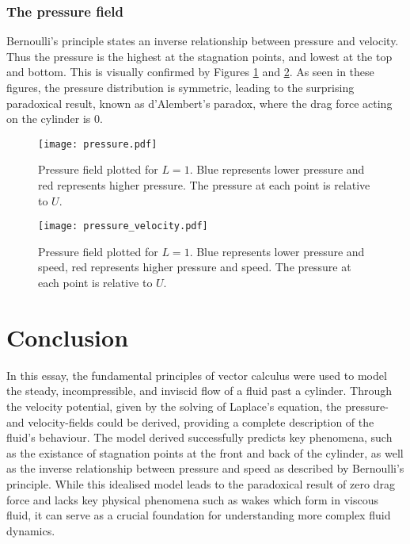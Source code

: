 \subsubsection{The pressure field}
Bernoulli's principle states an inverse relationship between pressure and velocity. Thus the pressure is the highest at the stagnation points,
and lowest at the top and bottom. This is visually confirmed by Figures \ref{figure:pressure:1} and \ref{figure:pressure:2}. As seen in these figures,
the pressure distribution is symmetric, leading to the surprising paradoxical result, known as d'Alembert's paradox, where the drag force acting on the cylinder is $0$.
\begin{figure}
	\centering
	\texttt{[image: pressure.pdf]}
	\caption{Pressure field plotted for $L=1$. Blue represents lower pressure and red represents higher pressure. The pressure at each point is relative to $U$.}
	\label{figure:pressure:1}
\end{figure}
\begin{figure}
	\centering
	\texttt{[image: pressure\_velocity.pdf]}
	\caption{Pressure field plotted for $L=1$. Blue represents lower pressure and speed, red represents higher pressure and speed. The pressure at each point is relative to $U$.}
	\label{figure:pressure:2}
\end{figure}

\section{Conclusion}
In this essay, the fundamental principles of vector calculus were used to model the steady, incompressible, and inviscid flow of a fluid past a cylinder.
Through the velocity potential, given by the solving of Laplace's equation, the pressure- and velocity-fields could be derived, providing a complete 
description of the fluid's behaviour. The model derived successfully predicts key phenomena, such as the existance of stagnation points at the front and
back of the cylinder, as well as the inverse relationship between pressure and speed as described by Bernoulli's principle. While this idealised model
leads to the paradoxical result of zero drag force and lacks key physical phenomena such as wakes which form in viscous fluid, it can serve as a crucial
foundation for understanding more complex fluid dynamics.